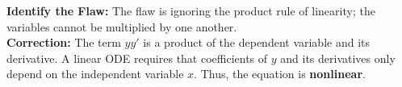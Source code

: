 \documentclass[11pt]{article}
\begin{document}
\textbf{Identify the Flaw:} The flaw is ignoring the product rule of linearity; the variables cannot be multiplied by one another. \\
\textbf{Correction:} The term $y y'$ is a product of the dependent variable and its derivative. A linear ODE requires that coefficients of $y$ and its derivatives only depend on the independent variable $x$. Thus, the equation is \textbf{nonlinear}.
\end{document}
